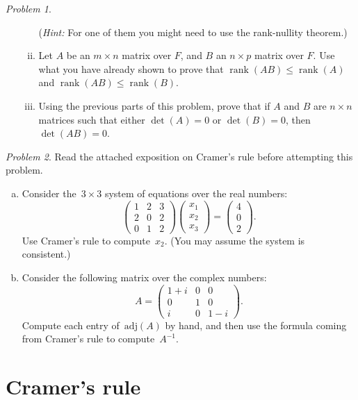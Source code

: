 \documentclass[11pt,twoside]{amsart}
\theoremstyle{plain}
\theoremstyle{remark}
\newtheorem{prob}{Problem}
\theoremstyle{definition}
\theoremstyle{definition}
\newcommand{\rank}{\operatorname{rank}}
\begin{document}
\begin{prob}
\begin{enumerate}[(a)]
\begin{enumerate}[(i)]
  (\emph{Hint:} For one of them you might need to use the rank-nullity theorem.)
  \item Let $A$ be an $m\times n$ matrix over $F$, and $B$ an $n\times p$ matrix
    over $F$. Use what you have already shown to prove that $\rank(AB)\leq \rank(A)$ and $\rank(AB)\leq \rank(B)$.
  \item Using the previous parts of this problem, prove that if $A$ and $B$ are $n\times n$ matrices such that either $\det(A)=0$ or $\det(B)=0$, then $\det(AB)=0$.
  \end{enumerate}
\end{enumerate}
\end{prob}

\begin{prob}
Read the attached exposition on Cramer's rule before attempting this
problem.
\begin{enumerate}[(a)]
 \item Consider the~$3\times 3$ system of equations over the real numbers:
\[
\left(\begin{array}{ccc}
   1&2&3\\
   2&0&2\\
   0&1&2
\end{array} \right)
\left(\begin{array}{c}
   x_1\\x_2\\x_3
\end{array} \right)
=
\left(\begin{array}{c}
   4\\0\\2
\end{array} \right).
\]
Use Cramer's rule to compute~$x_2$. (You may assume the system is
consistent.)
\item Consider the following matrix over the complex numbers:
\[
A=
\left(\begin{array}{ccc}
  1+i & 0 & 0 \\
  0     & 1 & 0 \\
  i     & 0 & 1-i
\end{array}\right).
\]
Compute each entry of~$\mathrm{adj}(A)$ by hand, and then use
the formula coming from Cramer's rule to compute~$A^{-1}$.
\end{enumerate}
\end{prob}

\newpage
\section*{Cramer's rule}
\end{document}
